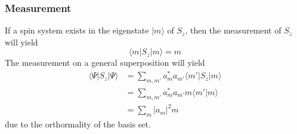 \documentclass[11.5pt,a4paper]{article}
\begin{document}
\subsubsection{Measurement}
If a spin system exists in the eigenstate $|m\rangle$ of $S_z$, then the measurement of $S_z$ will yield
\begin{equation}
 \langle m | S_z | m \rangle = m
\end{equation}
The measurement on a general superposition will yield
\begin{align}
 \langle \Psi | S_z | \Psi \rangle & = \sum_{m,m'} a_m^* a_{m'} \langle m' | S_z | m \rangle\\
  & = \sum_{m,m'} a_m^* a_{m'} m \langle m' | m \rangle\\
  & = \sum_{m} |a_{m}|^2  m
\end{align}
due to the orthormality of the basis set.
\end{document}
